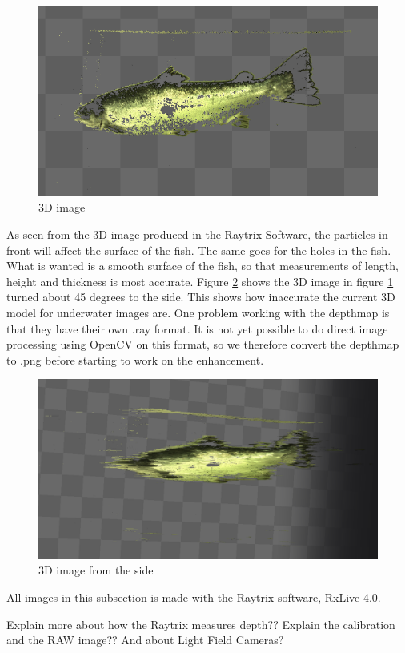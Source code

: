 \begin{figure}[h]
    \centering
    \includegraphics[width=.9\linewidth]{Images/depth3D}
    \caption{3D image}
    \label{fig:3d_image}
\end{figure}

As seen from the 3D image produced in the Raytrix Software, the particles in front will affect the surface of the fish. The same goes for the holes in the fish. What is wanted is a smooth surface of the fish, so that measurements of length, height and thickness is most accurate. Figure \ref{fig:3d_image_side} shows the 3D image in figure \ref{fig:3d_image} turned about 45 degrees to the side. This shows how inaccurate the current 3D model for underwater images are. 
One problem working with the depthmap is that they have their own .ray format. It is not yet possible to do direct image processing using OpenCV on this format, so we therefore convert the depthmap to .png before starting to work on the enhancement.

\begin{figure}[h]
    \centering
    \includegraphics[width=.9\linewidth]{Images/depth3D_side}
    \caption{3D image from the side}
    \label{fig:3d_image_side}
\end{figure}


All images in this subsection is made with the Raytrix software, RxLive 4.0.


{\color{red}Explain more about how the Raytrix measures depth?? Explain the calibration and the RAW image?? And about Light Field Cameras?}
